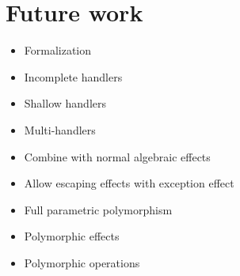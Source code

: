 \section{Future work}

\begin{itemize}
\item Formalization
\item Incomplete handlers
\item Shallow handlers
\item Multi-handlers
\item Combine with normal algebraic effects
\item Allow escaping effects with exception effect
\item Full parametric polymorphism
\item Polymorphic effects
\item Polymorphic operations
\end{itemize}

